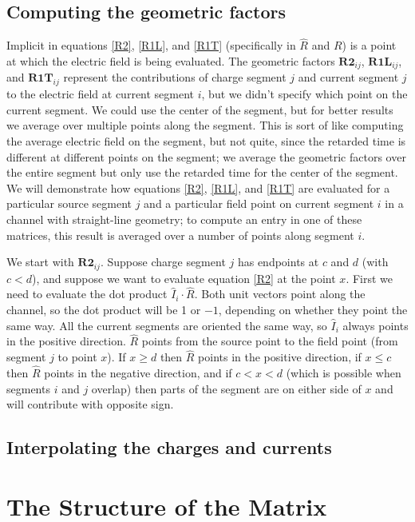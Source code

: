 \documentclass{article}
\newcommand{\mat}{\mathbf}
\begin{document}
\subsection{Computing the geometric factors}
Implicit in equations \ref{R2}, \ref{R1L}, and \ref{R1T} (specifically in $\hat{R}$ and $R$) is a point at which the electric field is being evaluated. The geometric factors $\mat{R2}_{ij}$, $\mat{R1L}_{ij}$, and $\mat{R1T}_{ij}$ represent the contributions of charge segment $j$ and current segment $j$ to the electric field at current segment $i$, but we didn't specify which point on the current segment. We could use the center of the segment, but for better results we average over multiple points along the segment. This is sort of like computing the average electric field on the segment, but not quite, since the retarded time is different at different points on the segment; we average the geometric factors over the entire segment but only use the retarded time for the center of the segment. We will demonstrate how equations \ref{R2}, \ref{R1L}, and \ref{R1T} are evaluated for a particular source segment $j$ and a particular field point on current segment $i$ in a channel with straight-line geometry; to compute an entry in one of these matrices, this result is averaged over a number of points along segment $i$.

We start with $\mat{R2}_{ij}$. Suppose charge segment $j$ has endpoints at $c$ and $d$ (with $c<d$), and suppose we want to evaluate equation \ref{R2} at the point $x$. First we need to evaluate the dot product $\hat{I}_i\cdot\hat{R}$. Both unit vectors point along the channel, so the dot product will be 1 or $-1$, depending on whether they point the same way. All the current segments are oriented the same way, so $\hat{I}_i$ always points in the positive direction. $\hat{R}$ points from the source point to the field point (from segment $j$ to point $x$). If $x \geq d$ then $\hat{R}$ points in the positive direction, if $x \leq c$ then $\hat{R}$ points in the negative direction, and if $c<x<d$ (which is possible when segments $i$ and $j$ overlap) then parts of the segment are on either side of $x$ and will contribute with opposite sign.

\subsection{Interpolating the charges and currents}

\section{The Structure of the Matrix}
\end{document}
